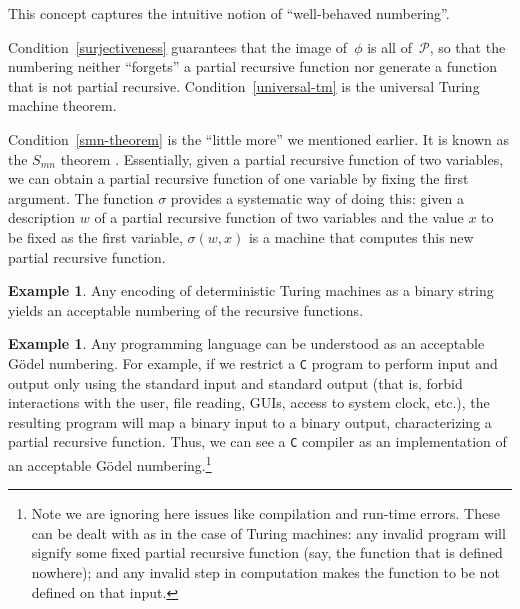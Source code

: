 \documentclass[12pt]{article}
\theoremstyle{definition}
\newtheorem{example}[definition]{Example}
\begin{document}
This concept captures the intuitive notion of
``well-behaved numbering''.

Condition~\ref{surjectiveness}
guarantees that the image of~$\phi$ is all of~$\mathcal P$,
so that the numbering neither ``forgets'' a partial recursive function
nor generate a function that is not partial recursive.
Condition~\ref{universal-tm} is the universal Turing machine theorem.

Condition~\ref{smn-theorem} is the ``little more'' we mentioned earlier.
It is known as the $S_{mn}$ theorem \cite[p.~24]{Rogers1987}.
Essentially,
given a partial recursive function of two variables,
we can obtain a partial recursive function of one variable
by fixing the first argument.
The function $\sigma$ provides a systematic way of doing this:
given a description $w$ of a partial recursive function of two variables
and the value $x$ to be fixed as the first variable,
$\sigma(w, x)$ is a machine that computes this new partial recursive function.

\vspace{6pt}
\begin{example}\label{standard-numbering}
    Any encoding of deterministic Turing machines as a binary string
    yields an acceptable numbering of the recursive functions.
\end{example}

\vspace{6pt}
\begin{example}\label{c}
    Any programming language can be understood as an acceptable Gödel numbering.
    For example,
    if we restrict a \texttt C program
    to perform input and output only using the standard input and standard output
    (that is, forbid interactions with the user, file reading, GUIs,
    access to system clock, etc.),
    the resulting program will map a binary input to a binary output,
    characterizing a partial recursive function.
    Thus, we can see a \texttt C compiler
    as an implementation of an acceptable Gödel numbering.\footnote{
        Note we are ignoring here issues like compilation and run-time errors.
        These can be dealt with as in the case of Turing machines:
        any invalid program will signify some fixed partial recursive function
        (say, the function that is defined nowhere);
        and any invalid step in computation
        makes the function to be not defined on that input.
    }
\end{example}
\end{document}
